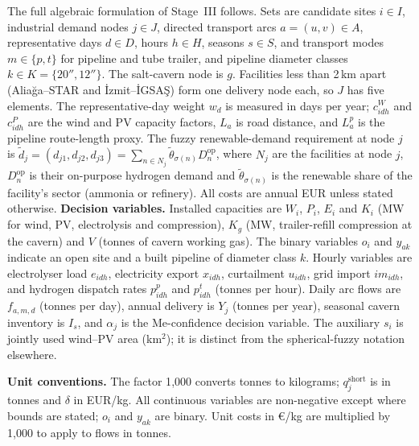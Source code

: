 The full algebraic formulation of Stage~III follows. Sets are candidate sites $i\in I$,
industrial demand nodes $j\in J$, directed transport arcs $a=(u,v)\in A$,
representative days $d\in D$, hours $h\in H$, seasons $s\in S$, and transport
modes $m\in\{p,t\}$ for pipeline and tube trailer, and pipeline diameter classes
$k\in K=\{20'',12''\}$. The salt-cavern node is $g$. Facilities less than 2\,km apart
(Aliağa--STAR and İzmit--İGSAŞ) form one delivery node each, so $J$ has five elements. The representative-day weight $w_d$ is measured in days per year;
$c^W_{idh}$ and $c^P_{idh}$ are the wind and PV capacity factors, $L_a$ is
road distance, and $L^p_a$ is the pipeline route-length proxy. The fuzzy
renewable-demand requirement at node $j$ is
$\tilde d_j=(d_{j1},d_{j2},d_{j3})=\sum_{n\in N_j}\tilde\theta_{\sigma(n)} D_n^{\mathrm{op}}$, where $N_j$
are the facilities at node $j$, $D_n^{\mathrm{op}}$ is their on-purpose hydrogen demand and
$\tilde\theta_{\sigma(n)}$ is the renewable share of the facility's sector (ammonia or refinery). All costs are annual EUR
unless stated otherwise.
\textbf{Decision variables.} Installed capacities are $W_i$, $P_i$, $E_i$
and $K_i$ (MW for wind, PV, electrolysis and compression), $K_g$ (MW, trailer-refill
compression at the cavern) and $V$ (tonnes of cavern working gas). The binary variables $o_i$ and
$y_{ak}$ indicate an open site and a built pipeline of diameter class $k$. Hourly variables are electrolyser load $e_{idh}$,
electricity export $x_{idh}$, curtailment $u_{idh}$, grid import $im_{idh}$,
and hydrogen dispatch rates $p^p_{idh}$ and $p^t_{idh}$ (tonnes per hour).
Daily arc flows are $f_{a,m,d}$ (tonnes per day), annual delivery is $Y_j$
(tonnes per year), seasonal cavern inventory is $I_s$, and $\alpha_j$ is the
Me-confidence decision variable. The auxiliary $s_i$ is jointly used wind--PV
area (km$^2$); it is distinct from the spherical-fuzzy notation elsewhere.

\textbf{Unit conventions.} The factor 1{,}000 converts tonnes to kilograms; $q_j^{\mathrm{short}}$
is in tonnes and $\delta$ in EUR/kg. All continuous variables are non-negative except where bounds are stated;
$o_i$ and $y_{ak}$ are binary. Unit costs in €/kg are multiplied by 1{,}000 to apply to flows in tonnes.
